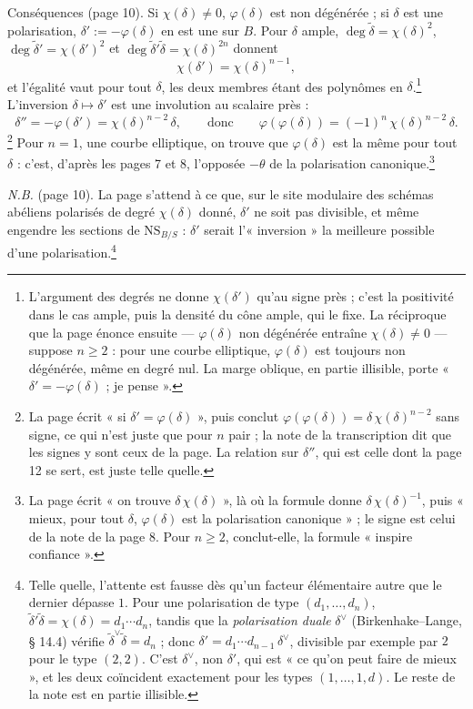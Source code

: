 \documentclass[11pt,a4paper]{article}
\begin{document}
Conséquences (page 10). Si $\chi(\delta) \neq 0$, $\varphi(\delta)$ est non
dégénérée ; si $\delta$ est une polarisation, $\delta' := -\varphi(\delta)$ en
est une sur $B$. Pour $\delta$ ample, $\deg \tilde{\delta} = \chi(\delta)^{2}$,
$\deg \tilde{\delta}' = \chi(\delta')^{2}$ et $\deg
\tilde{\delta}'\tilde{\delta} = \chi(\delta)^{2n}$ donnent
\[
\chi(\delta') = \chi(\delta)^{n-1},
\]
et l'égalité vaut pour tout $\delta$, les deux membres étant des polynômes en
$\delta$.\footnote{L'argument des degrés ne donne $\chi(\delta')$ qu'au signe
près ; c'est la positivité dans le cas ample, puis la densité du cône ample,
qui le fixe. La réciproque que la page énonce ensuite — $\varphi(\delta)$ non
dégénérée entraîne $\chi(\delta) \neq 0$ — suppose $n \geq 2$ : pour une
courbe elliptique, $\varphi(\delta)$ est toujours non dégénérée, même en degré
nul. La marge oblique, en partie illisible, porte « $\delta' =
-\varphi(\delta)$ ; je pense ».} L'inversion $\delta \mapsto \delta'$ est une
involution au scalaire près :
\[
\delta'' = -\varphi(\delta') = \chi(\delta)^{n-2}\,\delta,
\qquad\text{donc}\qquad
\varphi(\varphi(\delta)) = (-1)^{n}\,\chi(\delta)^{n-2}\,\delta .
\]
\footnote{La page écrit « si $\delta' = \varphi(\delta)$ », puis conclut
$\varphi(\varphi(\delta)) = \delta\,\chi(\delta)^{n-2}$ sans signe, ce qui
n'est juste que pour $n$ pair ; la note de la transcription dit que les
signes y sont ceux de la page. La relation sur $\delta''$, qui est celle dont
la page 12 se sert, est juste telle quelle.} Pour $n = 1$, une courbe
elliptique, on trouve que $\varphi(\delta)$ est la même pour tout $\delta$ :
c'est, d'après les pages 7 et 8, l'opposée $-\theta$ de la polarisation
canonique.\footnote{La page écrit « on trouve $\delta\,\chi(\delta)$ », là où
la formule donne $\delta\,\chi(\delta)^{-1}$, puis « mieux, pour tout
$\delta$, $\varphi(\delta)$ est la polarisation canonique » ; le signe est
celui de la note de la page 8. Pour $n \geq 2$, conclut-elle, la formule
« inspire confiance ».}

\emph{N.B.} (page 10). La page s'attend à ce que, sur le site modulaire des
schémas abéliens polarisés de degré $\chi(\delta)$ donné, $\delta'$ ne soit pas
divisible, et même engendre les sections de $\mathrm{NS}_{B/S}$ : $\delta'$
serait l'« inversion » la meilleure possible d'une polarisation.\footnote{Telle
quelle, l'attente est fausse dès qu'un facteur élémentaire autre que le dernier
dépasse $1$. Pour une polarisation de type $(d_1, \ldots, d_n)$,
$\tilde{\delta}'\tilde{\delta} = \chi(\delta) = d_1 \cdots d_n$, tandis que la
\emph{polarisation duale} $\delta^{\vee}$ (Birkenhake--Lange, § 14.4) vérifie
$\tilde{\delta}^{\vee}\tilde{\delta} = d_n$ ; donc $\delta' = d_1 \cdots
d_{n-1}\,\delta^{\vee}$, divisible par exemple par $2$ pour le type $(2,2)$.
C'est $\delta^{\vee}$, non $\delta'$, qui est « ce qu'on peut faire de mieux »,
et les deux coïncident exactement pour les types $(1, \ldots, 1, d)$. Le reste
de la note est en partie illisible.}
\end{document}
